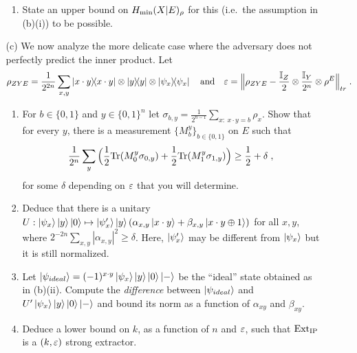 \documentclass[12pt]{article}
\begin{document}
\begin{enumerate}
\begin{enumerate}
\begin{enumerate}
\item State an upper bound on $H_{\rm min}(X|E)_\rho$ for this (i.e.\ the assumption in (b)(i)) to be possible. 
\end{enumerate}
\item[(c)] We now analyze the more delicate case where the adversary does not perfectly predict the inner product. Let 
\[ \rho_{ZYE}=\frac{1}{2^{2n}}\sum_{x,y} \ket{x\cdot y}\!\!\bra{x\cdot y}\otimes \ket{y}\!\!\bra{y}\otimes\ket{\psi_x}\!\!\bra{\psi_x}\quad\text{and}\quad\varepsilon = \Big\|\rho_{ZYE} - \frac{\mathbb{I}_Z}{2} \otimes \frac{\mathbb{I}_Y}{2^n}  \otimes \rho^E\Big\|_{tr}\;.\]
 \begin{enumerate}
\item For $b\in\{0,1\}$ and $y\in\{0,1\}^n$ let $\sigma_{b,y} = \frac{1}{2^{n-1}}\sum_{x:\ x\cdot y=b}\rho_x$. 
 Show that for every $y$, there is a measurement $\{M^y_b\}_{b\in\{0,1\}}$ on $E$ such that 
\[\frac{1}{2^n}\sum_y \Big(  \frac{1}{2}\mathrm{Tr}(M^y_{0} \sigma_{0,y})+\frac{1}{2}\mathrm{Tr}(M^y_{1} \sigma_{1,y})\Big) \geq \frac{1}{2}+\delta\;,\]
 for some $\delta$ depending on $\varepsilon$ that you will determine. 
\item Deduce that there is a unitary $U:\ket{\psi_x}\ket{y}\ket{0} \mapsto \ket{\psi'_x}\ket{y}(\alpha_{x,y}\ket{x\cdot y}+\beta_{x,y}\ket{x\cdot y\oplus 1})$ for all $x,y$, where $2^{-2n}\sum_{x,y} |\alpha_{x,y}|^2 \geq \delta$. Here, $\ket{\psi'_x}$ may be different from $\ket{\psi_x}$ but it is still normalized.
\item Let $\ket{\psi_{ideal}} = (-1)^{x\cdot y}\ket{\psi_x}\ket{y}\ket{0}\ket{-}$ be the ``ideal'' state obtained as in (b)(ii). Compute the \emph{difference} between $\ket{\psi_{ideal}}$ and $U'\ket{\psi_x}\ket{y}\ket{0}\ket{-}$ and bound its norm as a function of $\alpha_{xy}$ and $\beta_{xy}$.
\item Deduce a lower bound on $k$, as a function of $n$ and $\varepsilon$, such that $\mathrm{Ext}_{\mathrm{IP}}$ is a $(k,\varepsilon)$ strong extractor.  
\end{enumerate}
\end{enumerate}

\end{enumerate}
\end{document}
